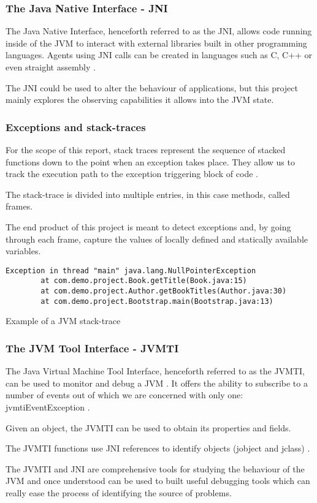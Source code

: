 \subsubsection{The Java Native Interface - JNI}
The Java Native Interface, henceforth referred to as the JNI, allows code running inside of the JVM to interact with external libraries built in other programming languages. Agents using JNI calls can be created in languages such as C, C++ or even straight assembly \cite{javaPerfJVM}.

The JNI could be used to alter the behaviour of applications, but this project mainly explores the observing capabilities it allows into the JVM state.

\subsubsection{Exceptions and stack-traces}
For the scope of this report, stack traces represent the sequence of stacked functions down to the point when an exception takes place. They allow us to track the execution path to the exception triggering block of code \cite{stacktrace}.

The stack-trace is divided into multiple entries, in this case methods, called frames. 

The end product of this project is meant to detect exceptions and, by going through each frame, capture the values of locally defined and statically available variables.

\begin{listing}[H]
\begin{verbatim}
Exception in thread "main" java.lang.NullPointerException
        at com.demo.project.Book.getTitle(Book.java:15)
        at com.demo.project.Author.getBookTitles(Author.java:30)
        at com.demo.project.Bootstrap.main(Bootstrap.java:13)
\end{verbatim}
\caption{Example of a JVM stack-trace}
\end{listing}

\subsubsection{The JVM Tool Interface - JVMTI}
The Java Virtual Machine Tool Interface, henceforth referred to as the JVMTI, can be used to monitor and debug a JVM \cite{jniwhatis}. It offers the ability to subscribe to a number of events out of which we are concerned with only one: jvmtiEventException \cite{jnievents}.

Given an object, the JVMTI can be used to obtain its properties and fields.

The JVMTI functions use JNI references to identify objects  (jobject and jclass) \cite{jniref}.

The JVMTI and JNI are comprehensive tools for studying the behaviour of the JVM and once understood can be used to built useful debugging tools which can really ease the process of identifying the source of problems.


\newpage

